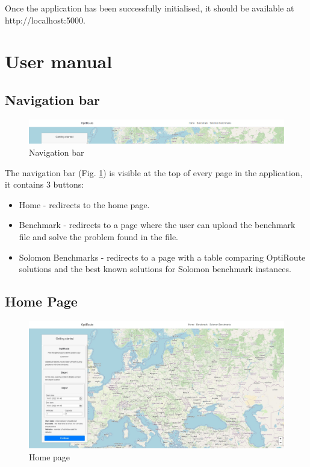 \documentclass[a4paper,twoside,12pt]{book}
\begin{document}
Once the application has been successfully initialised, it should be available at http://localhost:5000.
\section{User manual}
\subsection{Navigation bar}
\begin{figure}[H]
\centering
\includegraphics[width=\textwidth]{images/navbar.PNG}
\caption{Navigation bar}
\label{fig:navbar}
\end{figure}

The navigation bar (Fig. \ref{fig:navbar}) is visible at the top of every page in the application, it contains 3 buttons:
\begin{itemize}
\item Home - redirects to the home page.
\item Benchmark - redirects to a page where the user can upload the benchmark file and solve the problem found in the file.
\item Solomon Benchmarks - redirects to a page with a table comparing OptiRoute solutions and the best known solutions for Solomon benchmark instances.
\end{itemize}

\subsection{Home Page}
\begin{figure}[H]
\centering
\includegraphics[width=\textwidth]{images/home.jpg}
\caption{Home page}
\label{fig:home}
\end{figure}
\end{document}

